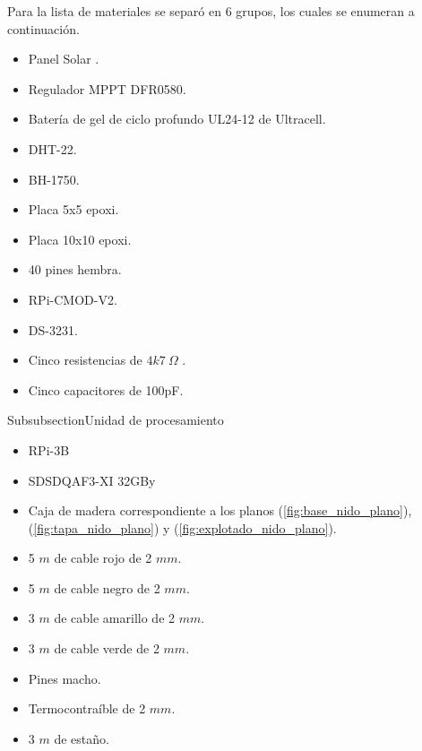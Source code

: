 Para la lista de materiales se separó en 6 grupos, los cuales se enumeran a continuación.

\begin{itemize}
	\item Panel Solar \TBD.
	\item Regulador MPPT DFR0580.
	\item Batería de gel de ciclo profundo UL24-12 de Ultracell.
\end{itemize}

\begin{itemize}
	\item DHT-22.
	\item BH-1750.
	\item Placa 5x5 epoxi.
	\item Placa 10x10 epoxi.
	\item 40 pines hembra.
	\item RPi-CMOD-V2.
	\item DS-3231.
	\item Cinco resistencias de $4k7 \ \Omega$ .
	\item Cinco capacitores de 100pF.
\end{itemize}

Subsubsection{Unidad de procesamiento}
\begin{itemize}
	\item RPi-3B
	\item SDSDQAF3-XI 32GBy
\end{itemize}

\begin{itemize}
	\item Caja de madera correspondiente a los planos (\ref{fig:base_nido_plano}), (\ref{fig:tapa_nido_plano}) y (\ref{fig:explotado_nido_plano}).
\end{itemize}

\begin{itemize}
	\item 5 $m$ de cable rojo de 2 $mm$.
	\item 5 $m$ de cable negro de 2 $mm$.
	\item 3 $m$ de cable amarillo de 2 $mm$.
	\item 3 $m$ de cable verde de 2 $mm$.
	\item Pines macho.
	\item Termocontraíble de 2 $mm$.
	\item 3 $m$ de estaño.
\end{itemize}









